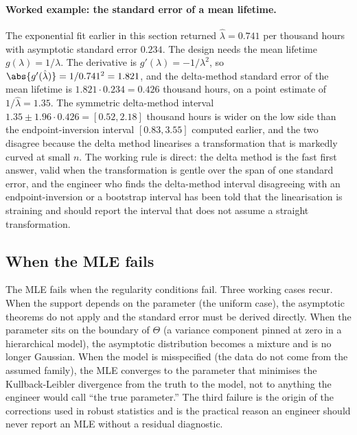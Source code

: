 \paragraph{Worked example: the standard error of a mean lifetime.}
The exponential fit earlier in this section returned $\hat{\lambda}
= 0.741$ per thousand hours with asymptotic standard error
$0.234$. The design needs the mean lifetime $g(\lambda) = 1/\lambda$.
The derivative is $g'(\lambda) = -1/\lambda^{2}$, so $\abs{g'
(\hat{\lambda})} = 1/0.741^{2} = 1.821$, and the delta-method
standard error of the mean lifetime is $1.821 \cdot 0.234 = 0.426$
thousand hours, on a point estimate of $1/\hat{\lambda} = 1.35$. The
symmetric delta-method interval $1.35 \pm 1.96 \cdot 0.426 = [0.52,
2.18]$ thousand hours is wider on the low side than the
endpoint-inversion interval $[0.83, 3.55]$ computed earlier, and the
two disagree because the delta method linearises a transformation
that is markedly curved at small $n$. The working rule is direct:
the delta method is the fast first answer, valid when the
transformation is gentle over the span of one standard error, and
the engineer who finds the delta-method interval disagreeing with an
endpoint-inversion or a bootstrap interval has been told that the
linearisation is straining and should report the interval that does
not assume a straight transformation.

\subsection{When the MLE fails}

The MLE fails when the regularity conditions fail. Three working
cases recur. When the support depends on the parameter (the uniform
case), the asymptotic theorems do not apply and the standard error
must be derived directly. When the parameter sits on the boundary
of $\Theta$ (a variance component pinned at zero in a hierarchical
model), the asymptotic distribution becomes a mixture and is no
longer Gaussian. When the model is misspecified (the data do not
come from the assumed family), the MLE converges to the parameter
that minimises the Kullback-Leibler divergence from the truth to
the model, not to anything the engineer would call ``the true
parameter.'' The third failure is the origin of the
 corrections used in robust statistics
and is the practical reason an engineer should never report an MLE
without a residual diagnostic.

